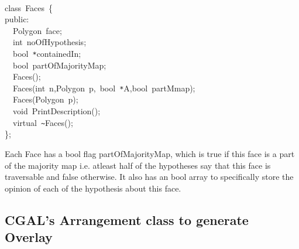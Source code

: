 \documentclass[a4paper,10pt]{article}
\begin{document}
{
\noindent \ttfamily
\jttstylea \\
\jttstylee class~\jttstylek Faces~\jttstylei \{\\
\jttstylee public\jttstylek :\\
\jttstylea ~~\jttstylek Polygon~face;\\
\jttstylea ~~\jttstylej int~\jttstylek noOfHypothesis;\\
\jttstylea ~~\jttstylek bool~\verb#*#containedIn;\\
\jttstylea ~~\jttstylek bool~partOfMajorityMap;\\
\jttstylea ~~\jttstylek Faces\jttstylei ()\jttstylek ;\\
\jttstylea ~~\jttstylek Faces\jttstylei (\jttstylej int~\jttstylek n,Polygon~p,~bool~\verb#*#A,bool~partMmap\jttstylei )\jttstylek ;\\
\jttstylea ~~\jttstylek Faces\jttstylei (\jttstylek Polygon~p\jttstylei )\jttstylek ;\\
\jttstylea ~~\jttstylej void~\jttstylek PrintDescription\jttstylei ()\jttstylek ;\\
\jttstylea ~~\jttstylek virtual~\verb#~#Faces\jttstylei ()\jttstylek ;\\
\jttstylei \}\jttstylek ;\\

}

Each Face has a bool flag partOfMajorityMap, which is true if this face is a part of the majority map i.e. atleast half of the 
hypotheses say that this face is traversable and false otherwise. It also has an bool array to specifically store the opinion of
 each of the hypothesis about this face.

\newpage
\subsection {CGAL's Arrangement class to generate Overlay}



\end{document}
